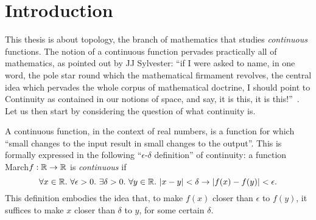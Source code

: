 \chapter{Introduction}\label{chap:intro}

This thesis is about topology, the branch of mathematics that studies \emph{continuous}
functions. The notion of a continuous function pervades practically all of mathematics, as
pointed out by JJ Sylvester: ``if I were asked to name, in one word, the pole star round
which the mathematical firmament revolves, the central idea which pervades the whole
corpus of mathematical doctrine, I should point to Continuity as contained in our notions
of space, and say, it is this, it is this!''~\cite[pg. 27]{armstrong-topology}. Let us
then start by considering the question of what continuity is.

A continuous function, in the context of real numbers, is a function for which
``small changes to the input result in small changes to the output''. This is
formally expressed in the following ``$\epsilon$-$\delta$ definition'' of continuity: a
function March$f : \mathbb{R}{} \rightarrow \mathbb{R}{}$ is
\emph{continuous} if
\begin{equation*}\label{eq:cont-0}
  \forall x \in \mathbb{R}{}.~ \forall \epsilon > 0.~ \exists \delta > 0.~ \forall y \in \mathbb{R}{}.~
    | x - y | < \delta \rightarrow | f(x) - f(y) | < \epsilon.
\end{equation*}
This definition embodies the idea that, to make $f(x)$ closer than $\epsilon$ to
$f(y)$, it suffices to make $x$ closer than $\delta$ to $y$, for some certain $\delta$.


